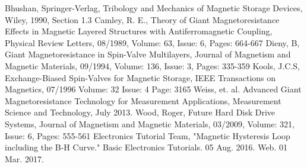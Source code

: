 \documentclass[11pt]{article}
\begin{document}
\begin{multicols}{2}
\begin{thebibliography}{9}
	{\footnotesize
	 Bhushan, Springer-Verlag, Tribology and Mechanics of Magnetic Storage Devices, Wiley, 1990, Section 1.3 
	 Camley, R. E., Theory of Giant Magnetoresistance Effects in Magnetic Layered Structures with Antiferromagnetic Coupling, Physical Review Letters, 08/1989, Volume: 63, Issue: 6, Pages: 664-667
	 Dieny, B, Giant Magnetoresistance in Spin-Valve Multilayers, Journal of Magnetism and Magnetic Materials, 09/1994, Volume: 136, Issue: 3, Pages: 335-359
	 Kools, J.C.S, Exchange-Biased Spin-Valves for Magnetic Storage, IEEE Transactions on Magnetics, 07/1996 Volume: 32 Issue: 4 Page: 3165
	Weiss, et. al. Advanced Giant Magnetoresistance Technology for Measurement Applications, Measurement Science and Technology, July 2013.  
	 Wood, Roger, Future Hard Disk Drive Systems, Journal of Magnetism and Magnetic Materials, 03/2009, Volume: 321, Issue: 6, Pages: 555-561
	 Electronics Tutorial Team, "Magnetic Hysteresis Loop including the B-H Curve." Basic Electronics Tutorials. 05 Aug. 2016. Web. 01 Mar. 2017.
	
	}
\end{thebibliography}

\end{multicols}%

\end{document}
